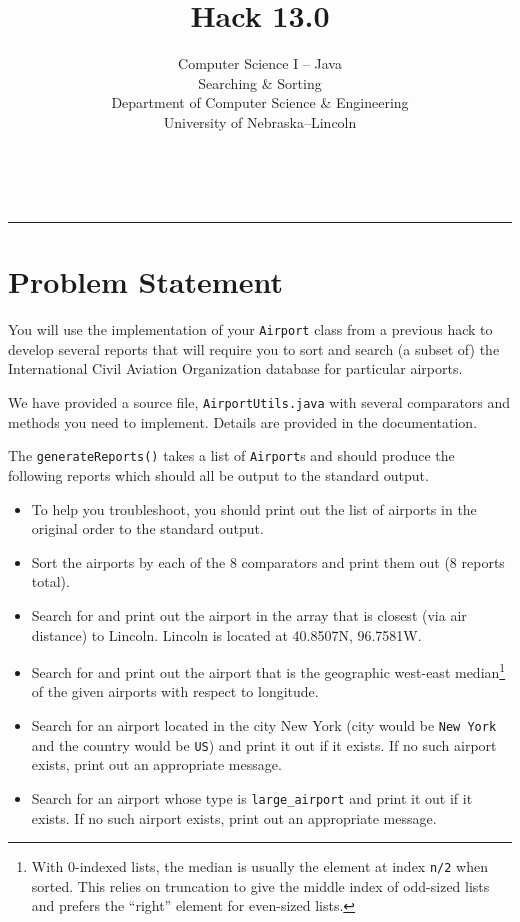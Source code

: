 \documentclass[12pt]{scrartcl}
\title{Hack 13.0}\let\Title\@title
\subtitle{Computer Science I -- Java\\
Searching \& Sorting\\
{\small
\vskip1cm
Department of Computer Science \& Engineering \\
University of Nebraska--Lincoln}
\vskip-3cm}
\date{~}
\begin{document}
\maketitle

\hrule



\section*{Problem Statement}

You will use the implementation of your \texttt{Airport} class 
from a previous hack to develop several reports that will require you to 
sort and search (a subset of) the International Civil Aviation Organization 
database for particular airports.  

We have provided a source file, \texttt{AirportUtils.java} with
several comparators and methods you need to implement.  Details are provided
in the documentation.  

The \texttt{generateReports()} takes a list of 
\texttt{Airport}s and should produce the
following reports which should all be output to the standard output.

\begin{itemize}
  \item To help you troubleshoot, you should print out the list of
  airports in the original order to the standard output.
  
  \item Sort the airports by each of the 8 comparators and print them 
  out (8 reports total).

  \item Search for and print out the airport in the array that is closest (via 
  air distance) to Lincoln.  Lincoln is located at 40.8507N, 96.7581W.

  \item Search for and print out the airport that is the geographic west-east
  median\footnote{With 0-indexed lists, the median is usually the element at
  index \texttt{n/2} when sorted.  This relies on truncation to give 
  the middle index of odd-sized lists and prefers the ``right'' element 
  for even-sized lists.} 
  of the given airports with respect to longitude.  
  
  \item Search for an airport located in the city New York (city would 
  be \texttt{New York} and the country would be 
  \texttt{US}) and print it out
  if it exists.  If no such airport exists, print out an appropriate message.
  
  \item Search for an airport whose type is \texttt{large_airport} and
  print it out if it exists.  If no such airport exists, print out an appropriate message.
\end{itemize}
\end{document}

